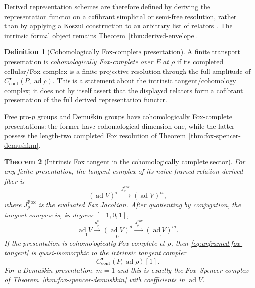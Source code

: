\documentclass[11pt]{article}
\newtheorem{theorem}{Theorem}[section]
\theoremstyle{definition}
\newtheorem{definition}[theorem]{Definition}
\begin{document}
Derived representation schemes are therefore defined by deriving the representation functor on a cofibrant simplicial or semi-free resolution, rather than by applying a Koszul construction to an arbitrary list of relators \cite{BKRDerived,BKRCyclic}.  The intrinsic formal object remains Theorem~\ref{thm:derived-envelope}.

\begin{definition}[Cohomologically Fox-complete presentation]\label{def:fox-complete}
A finite transport presentation is \emph{cohomologically Fox-complete over $E$ at $\rho$} if its completed cellular/Fox complex is a finite projective resolution through the full amplitude of $C^\bullet_{\mathrm{cont}}(P,\operatorname{ad}\rho)$.  This is a statement about the intrinsic tangent/cohomology complex; it does not by itself assert that the displayed relators form a cofibrant presentation of the full derived representation functor.
\end{definition}

Free pro-$p$ groups and Demu\v{s}kin groups have cohomologically Fox-complete presentations: the former have cohomological dimension one, while the latter possess the length-two completed Fox resolution of Theorem~\ref{thm:fox-spencer-demushkin}.

\begin{theorem}[Intrinsic Fox tangent in the cohomologically complete sector]\label{thm:intrinsic-fox-chart}
For any finite presentation, the tangent complex of its naive framed relation-derived fiber is
\begin{equation}\label{eq:framed-fox-tangent}
(\operatorname{ad}V)^d
\xrightarrow{\ J^{\mathrm{Fox}}_\rho\ }
(\operatorname{ad}V)^m,
\end{equation}
where $J^{\mathrm{Fox}}_\rho$ is the evaluated Fox Jacobian.  After quotienting by conjugation, the tangent complex is, in degrees $[-1,0,1]$,
\begin{equation}\label{eq:unframed-fox-tangent}
\underset{-1}{\operatorname{ad}V}
\xrightarrow{d^0_\rho}
\underset{0}{(\operatorname{ad}V)^d}
\xrightarrow{J^{\mathrm{Fox}}_\rho}
\underset{1}{(\operatorname{ad}V)^m}.
\end{equation}
If the presentation is cohomologically Fox-complete at $\rho$, then \eqref{eq:unframed-fox-tangent} is quasi-isomorphic to the intrinsic tangent complex
\[
C^\bullet_{\mathrm{cont}}(P,\operatorname{ad}\rho)[1].
\]
For a Demu\v{s}kin presentation, $m=1$ and this is exactly the Fox--Spencer complex of Theorem~\ref{thm:fox-spencer-demushkin} with coefficients in $\operatorname{ad}V$.
\end{theorem}
\end{document}
